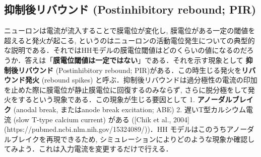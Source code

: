 \subsection{抑制後リバウンド (Postinhibitory rebound; PIR)}ニューロンは電流が流入することで膜電位が変化し, 膜電位がある一定の閾値を超えると発火が起こる, というのはニューロンの活動電位発生についての典型的な説明である．それではHHモデルの膜電位閾値はどのくらいの値になるのだろうか．答えは「\textbf{膜電位閾値は一定ではない}」である．それを示す現象として \textbf{抑制後リバウンド} (Postinhibitory rebound; PIR)がある．この時生じる発火を\textbf{リバウンド発火} (rebound spikes) 
と呼ぶ．抑制後リバウンドは過分極性の電流の印加を止めた際に膜電位が静止膜電位に回復するのみならず, さらに脱分極をして発火をするという現象である．この現象が生じる要因として
1. \textbf{アノーダルブレイク} (anodal break, またはanode break excitation; ABE)
2. 遅いT型カルシウム電流 (slow T-type calcium current)
がある ([Chik et al., 2004](https://pubmed.ncbi.nlm.nih.gov/15324089/))．HH モデルはこのうちアノーダルブレイクを再現できるため, シミュレーションによりどのような現象か確認してみよう．これは入力電流を変更するだけで行える．